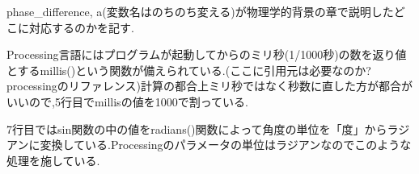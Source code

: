 phase\_difference, a(変数名はのちのち変える)が物理学的背景の章で説明したどこに対応するのかを記す.

Processing言語にはプログラムが起動してからのミリ秒(1/1000秒)の数を返り値とするmillis()という関数が備えられている.(ここに引用元は必要なのか?processingのリファレンス)計算の都合上ミリ秒ではなく秒数に直した方が都合がいいので,5行目でmillisの値を1000で割っている.

7行目ではsin関数の中の値をradians()関数によって角度の単位を「度」からラジアンに変換している.Processingのパラメータの単位はラジアンなのでこのような処理を施している.

